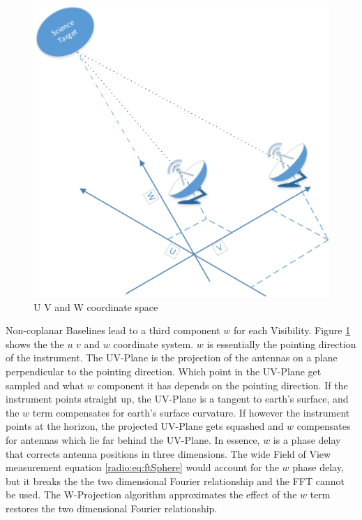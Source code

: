 \begin{figure}
	\centering
	\includegraphics[width=0.9\linewidth]{./chapters/03.radio/uvw.png}
	\caption{U V and W coordinate space}
	\label{radio:uvw}
	\vspace{-10pt}
\end{figure}

Non-coplanar Baselines lead to a third component $w$ for each Visibility. Figure \ref{radio:uvw} shows the the $u$ $v$ and $w$ coordinate system. $w$ is essentially the pointing direction of the instrument. The UV-Plane is the projection of the antennas on a plane perpendicular to the pointing direction. Which point in the UV-Plane get sampled and what $w$ component it has depends on the pointing direction. If the instrument points straight up, the UV-Plane is a tangent to earth's surface, and the $w$ term compensates for earth's surface curvature. If however the instrument points at the horizon, the projected UV-Plane gets squashed and $w$ compensates for antennas which lie far behind the UV-Plane. In essence, $w$ is a phase delay that corrects antenna positions in three dimensions. The wide Field of View measurement equation \eqref{radio:eq:ftSphere} would account for the $w$ phase delay, but it breaks the the two dimensional Fourier relationship and the FFT cannot be used. The W-Projection \cite{cornwell2008noncoplanar} algorithm approximates the effect of the $w$ term restores the two dimensional Fourier relationship.

